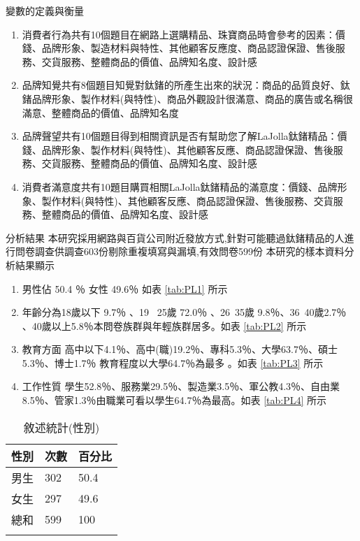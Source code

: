 變數的定義與衡量
\begin{enumerate}
\item  消費者行為共有10個題目在網路上選購精品、珠寶商品時會參考的因素：價錢、品牌形象、製造材料與特性、其他顧客反應度、商品認證保證、售後服務、交貨服務、整體商品的價值、品牌知名度、設計感
\item 品牌知覺共有8個題目知覺對鈦鍺的所產生出來的狀況：商品的品質良好、鈦鍺品牌形象、製作材料(與特性)、商品外觀設計很滿意、商品的廣告或名稱很滿意、整體商品的價值、品牌知名度
\item 品牌聲望共有10個題目得到相關資訊是否有幫助您了解LaJolla鈦鍺精品：價錢、品牌形象、製作材料(與特性)、其他顧客反應、商品認證保證、售後服務、交貨服務、整體商品的價值、品牌知名度、設計感
\item 消費者滿意度共有10題目購買相關LaJolla鈦鍺精品的滿意度：價錢、品牌形象、製作材料(與特性)、其他顧客反應、商品認證保證、售後服務、交貨服務、整體商品的價值、品牌知名度、設計感
\end{enumerate}
分析結果
本研究採用網路與百貨公司附近發放方式,針對可能聽過鈦鍺精品的人進行問卷調查供調查603份剔除重複填寫與漏填,有效問卷599份 
本研究的樣本資料分析結果顯示 
\begin{enumerate}
\item 男性佔 50.4 ％ 女性 49.6％ 如表 \ref{tab:PL1} 所示 
\item 年齡分為18歲以下 9.7％ 、19 ~25歲 72.0％ 、26~35歲 9.8％、36~40歲2.7％ 、40歲以上5.8％本問卷族群與年輕族群居多。如表  \ref{tab:PL2} 所示
\item 教育方面 高中以下4.1％、高中(職)19.2％、專科5.3％、大學63.7％、碩士5.3％、博士1.7％ 教育程度以大學64.7％為最多 。如表 \ref{tab:PL3} 所示
\item 工作性質 學生52.8％、服務業29.5％、製造業3.5％、軍公教4.3％、自由業8.5％、管家1.3％由職業可看以學生64.7％為最高。如表 \ref{tab:PL4} 所示
\end{enumerate}

\begin{table}[htb]
\caption{敘述統計(性別)}
\label{tab:PL1}
\renewcommand{\arraystretch}{1.2} %
\arrayrulewidth=1pt               %
\tabcolsep=60pt                   %
%
\begin{tabular}[t]{lll}  %
\hline
 性別&次數 & 百分比 \\
\hline
男生        & 302 & 50.4 \\
女生        & 297  & 49.6 \\
總和        & 599  & 100 \\
\hline
\centering
\label{fig:PL4}
\end{tabular}
\end{table}

